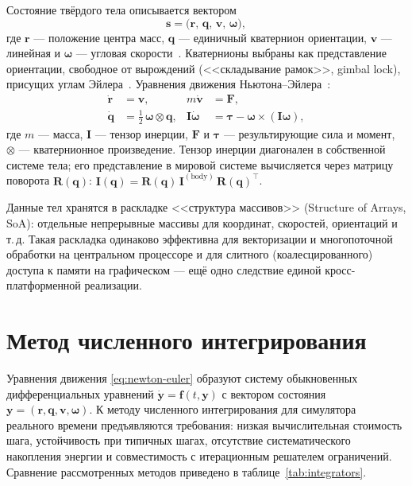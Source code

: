 Состояние твёрдого тела описывается вектором
\begin{equation}
  \mathbf{s} = \bigl(\mathbf{r},\, \mathbf{q},\, \mathbf{v},\,
  \boldsymbol{\omega}\bigr),
  \label{eq:state}
\end{equation}
где $\mathbf{r}$ --- положение центра масс, $\mathbf{q}$ --- единичный кватернион
ориентации, $\mathbf{v}$ --- линейная и $\boldsymbol{\omega}$ --- угловая
скорости~\cite{featherstone2008}. Кватернионы выбраны как представление
ориентации, свободное от вырождений (<<складывание рамок>>, gimbal lock),
присущих углам Эйлера~\cite{diebel2006}. Уравнения движения
Ньютона--Эйлера~\cite{baraff1997}:
\begin{align}
  \dot{\mathbf{r}} &= \mathbf{v}, &
  m\dot{\mathbf{v}} &= \mathbf{F}, \\
  \dot{\mathbf{q}} &= \tfrac12\,\boldsymbol{\omega}\otimes\mathbf{q}, &
  \mathbf{I}\dot{\boldsymbol{\omega}} &=
  \boldsymbol{\tau} - \boldsymbol{\omega}\times(\mathbf{I}\boldsymbol{\omega}),
  \label{eq:newton-euler}
\end{align}
где $m$ --- масса, $\mathbf{I}$ --- тензор инерции, $\mathbf{F}$ и
$\boldsymbol{\tau}$ --- результирующие сила и момент, $\otimes$ ---
кватернионное произведение. Тензор инерции диагонален в собственной системе
тела; его представление в мировой системе вычисляется через матрицу поворота
$\mathbf{R}(\mathbf{q})$:
$\mathbf{I}(\mathbf{q}) = \mathbf{R}(\mathbf{q})\,\mathbf{I}^{(\text{body})}\,
\mathbf{R}(\mathbf{q})^{\top}$.

Данные тел хранятся в раскладке <<структура массивов>> (Structure of Arrays,
SoA): отдельные непрерывные массивы для координат, скоростей, ориентаций и
т.\,д. Такая раскладка одинаково эффективна для векторизации и многопоточной
обработки на центральном процессоре и для слитного (коалесцированного) доступа
к памяти на графическом --- ещё одно следствие единой кросс-платформенной
реализации.

\section{Метод численного интегрирования}

Уравнения движения \eqref{eq:newton-euler} образуют систему обыкновенных
дифференциальных уравнений $\dot{\mathbf{y}} = \mathbf{f}(t, \mathbf{y})$ с
вектором состояния $\mathbf{y} = (\mathbf{r}, \mathbf{q}, \mathbf{v},
\boldsymbol{\omega})$. К методу численного интегрирования для симулятора
реального времени предъявляются требования: низкая вычислительная стоимость
шага, устойчивость при типичных шагах, отсутствие систематического накопления
энергии и совместимость с итерационным решателем ограничений. Сравнение
рассмотренных методов приведено в таблице~\ref{tab:integrators}.

